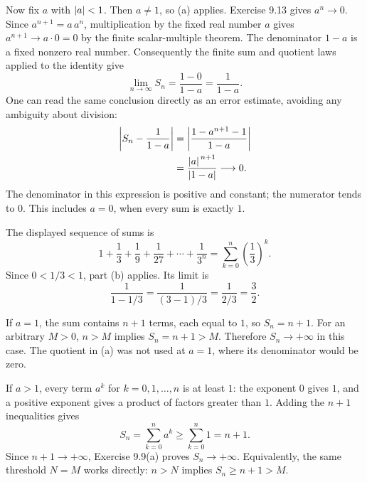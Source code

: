 Now fix $a$ with $\left|a\right|<1$. Then $a\ne1$, so (a)
applies. Exercise 9.13 gives $a^n\to0$.
Since $a^{n+1}=a\,a^n$, multiplication by the fixed real
number $a$ gives $a^{n+1}\to a\cdot0=0$ by the finite
scalar-multiple theorem. The denominator $1-a$ is a fixed
nonzero real number. Consequently the finite sum and quotient
laws applied to the identity give
\[
 \lim_{n\to\infty}S_n=\frac{1-0}{1-a}=\frac1{1-a}.
\]
One can read the same conclusion directly as an error
estimate, avoiding any ambiguity about division:
\begin{align*}
 \left|S_n-\frac1{1-a}\right|
 &=\left|\frac{1-a^{n+1}-1}{1-a}\right|\\
 &=\frac{\left|a\right|^{\,n+1}}{\left|1-a\right|}\longrightarrow0.
\end{align*}
The denominator in this expression is positive and constant;
the numerator tends to $0$. This includes $a=0$, when every
sum is exactly $1$.


The displayed sequence of sums is
\[
 1+\frac13+\frac19+\frac1{27}+\cdots+\frac1{3^n}
 =\sum_{k=0}^{n}\left(\frac13\right)^k.
\]
Since $0<1/3<1$, part (b) applies. Its limit is
\[
 \frac1{1-1/3}
 =\frac1{(3-1)/3}
 =\frac1{2/3}
 =\frac32.
\]


If $a=1$, the sum contains $n+1$ terms, each equal to $1$,
so $S_n=n+1$. For an arbitrary $M>0$, $n>M$ implies
$S_n=n+1>M$. Therefore $S_n\to+\infty$ in this case.
The quotient in (a) was not used at $a=1$, where its
denominator would be zero.

If $a>1$, every term $a^k$ for $k=0,1,\ldots,n$ is at
least $1$: the exponent $0$ gives $1$, and a positive
exponent gives a product of factors greater than $1$.
Adding the $n+1$ inequalities gives
\[
 S_n=\sum_{k=0}^{n}a^k\geq\sum_{k=0}^{n}1=n+1.
\]
Since $n+1\to+\infty$, Exercise 9.9(a) proves
$S_n\to+\infty$. Equivalently, the same threshold $N=M$
works directly: $n>N$ implies $S_n\geq n+1>M$.

